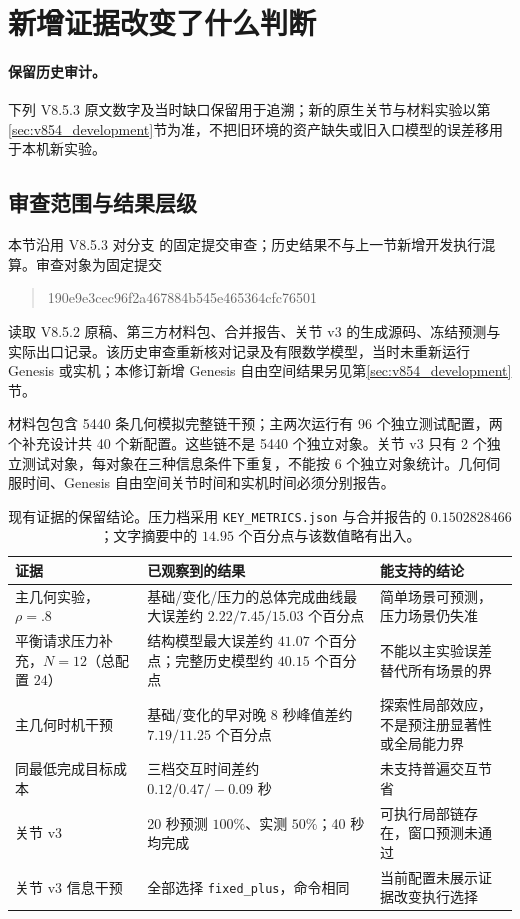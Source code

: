 \documentclass[11pt,a4paper,fontset=fandol]{ctexart}
\theoremstyle{definition}
\theoremstyle{remark}\newtheorem{remark}[theorem]{说明}
\numberwithin{equation}{section}
\begin{document}
\section{新增证据改变了什么判断}
\label{sec:audit}
\paragraph{保留历史审计。} 下列 V8.5.3 原文数字及当时缺口保留用于追溯；新的原生关节与材料实验以第\ref{sec:v854_development}节为准，不把旧环境的资产缺失或旧入口模型的误差移用于本机新实验。
\subsection{审查范围与结果层级}
本节沿用 V8.5.3 对分支  的固定提交审查；历史结果不与上一节新增开发执行混算。审查对象为固定提交
\begin{quote}\small\ttfamily
190e9e3cec96f2a467884b545e465364cfc76501
\end{quote}
读取 V8.5.2 原稿、第三方材料包、合并报告、关节 v3 的生成源码、冻结预测与实际出口记录\cite{v852,evidence,results,jointcode,jointdata}。该历史审查重新核对记录及有限数学模型，当时未重新运行 Genesis 或实机；本修订新增 Genesis 自由空间结果另见第\ref{sec:v854_development}节。

材料包包含 5440 条几何模拟完整链干预；主两次运行有 96 个独立测试配置，两个补充设计共 40 个新配置。这些链不是 5440 个独立对象。关节 v3 只有 2 个独立测试对象，每对象在三种信息条件下重复，不能按 6 个独立对象统计。几何伺服时间、Genesis 自由空间关节时间和实机时间必须分别报告。

\begin{table}[htbp]\centering\small
\begin{tabularx}{\linewidth}{P{.24\linewidth}YY}\toprule
证据 & 已观察到的结果 & 能支持的结论\\\midrule
主几何实验，$\rho=.8$ & 基础/变化/压力的总体完成曲线最大误差约 $2.22/7.45/15.03$ 个百分点 & 简单场景可预测，压力场景仍失准\\
平衡请求压力补充，$N=12$（总配置 $24$） & 结构模型最大误差约 $41.07$ 个百分点；完整历史模型约 $40.15$ 个百分点 & 不能以主实验误差替代所有场景的界\\
主几何时机干预 & 基础/变化的早对晚 8 秒峰值差约 $7.19/11.25$ 个百分点 & 探索性局部效应，不是预注册显著性或全局能力界\\
同最低完成目标成本 & 三档交互时间差约 $0.12/0.47/-0.09$ 秒 & 未支持普遍交互节省\\
关节 v3 & 20 秒预测 $100\%$、实测 $50\%$；40 秒均完成 & 可执行局部链存在，窗口预测未通过\\
关节 v3 信息干预 & 全部选择 \texttt{fixed\_plus}，命令相同 & 当前配置未展示证据改变执行选择\\\bottomrule
\end{tabularx}
\caption{现有证据的保留结论。压力档采用 \texttt{KEY\_METRICS.json} 与合并报告的 $0.1502828466$；文字摘要中的 $14.95$ 个百分点与该数值略有出入。}
\label{tab:evidence}
\end{table}
\end{document}
